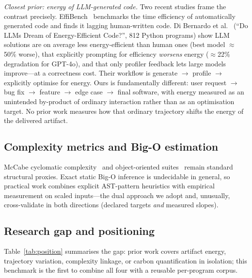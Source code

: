 \documentclass[journal]{IEEEtran}
\begin{document}
\emph{Closest prior: energy of LLM-generated code.} Two recent studies frame
the contrast precisely. EffiBench~\cite{huang2024} benchmarks the time
efficiency of automatically generated code and finds it lagging
human-written code. Di Bernardo et al.~\cite{dibernardo2026} (``Do LLMs
Dream of Energy-Efficient Code?'', 812 Python programs) show LLM solutions
are on average less energy-efficient than human ones (best model $\approx$
50\% worse), that explicitly prompting for efficiency \emph{worsens} energy
($\approx$22\% degradation for GPT-4o), and that only profiler feedback
lets large models improve---at a correctness cost. Their workflow is
generate $\rightarrow$ profile $\rightarrow$ explicitly optimise for energy.
Ours is fundamentally different: user request $\rightarrow$ bug fix
$\rightarrow$ feature $\rightarrow$ edge case $\rightarrow$ final software,
with energy measured as an unintended by-product of ordinary interaction
rather than as an optimisation target. No prior work measures how that
ordinary trajectory shifts the energy of the delivered artifact.

\subsection{Complexity metrics and Big-O estimation}
McCabe cyclomatic complexity~\cite{mccabe1976} and object-oriented
suites~\cite{chidamber1994} remain standard structural proxies. Exact static
Big-O inference is undecidable in general, so practical work combines
explicit AST-pattern heuristics with empirical measurement on scaled
inputs---the dual approach we adopt and, unusually, cross-validate in both
directions (declared targets \emph{and} measured slopes).

\subsection{Research gap and positioning}
Table~\ref{tab:position} summarises the gap: prior work covers artifact
energy, trajectory variation, complexity linkage, or carbon quantification
in isolation; this benchmark is the first to combine all four with a
reusable per-program corpus.
\end{document}
